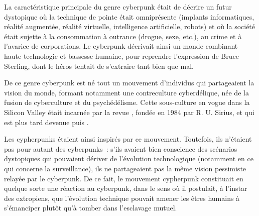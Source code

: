 La caractéristique principale du genre cyberpunk était de décrire un futur dystopique où la technique de pointe était omniprésente (implants informatiques, réalité augmentée, réalité virtuelle, intelligence artificielle, robots) et où la société était sujette à la consommation à outrance (drogue, sexe, etc.), au crime et à l'avarice de corporations. Le cyberpunk décrivait ainsi un monde combinant haute technologie et bassesse humaine, pour reprendre l'expression de Bruce Sterling, dont le héros tentait de s'extraire tant bien que mal. %

De ce genre cyberpunk est né tout un mouvement d'individus qui partageaient la vision du monde, formant notamment une contreculture cyberdélique, née de la fusion de cyberculture et du psychédélisme. Cette sous-culture en vogue dans la Silicon Valley était incarnée par la revue , fondée en 1984 par R. U. Sirius, et qui est plus tard devenue  puis .

Les cypherpunks étaient ainsi inspirés par ce mouvement. Toutefois, ils n'étaient pas pour autant des cyberpunks~: s'ils avaient bien conscience des scénarios dystopiques qui pouvaient dériver de l'évolution technologique (notamment en ce qui concerne la surveillance), ils ne partageaient pas la même vision pessimiste relayée par le cyberpunk. De ce fait, le mouvement cypherpunk constituait en quelque sorte une réaction au cyberpunk, dans le sens où il postulait, à l'instar des extropiens, que l'évolution technique pouvait amener les êtres humains à s'émanciper plutôt qu'à tomber dans l'esclavage mutuel.

